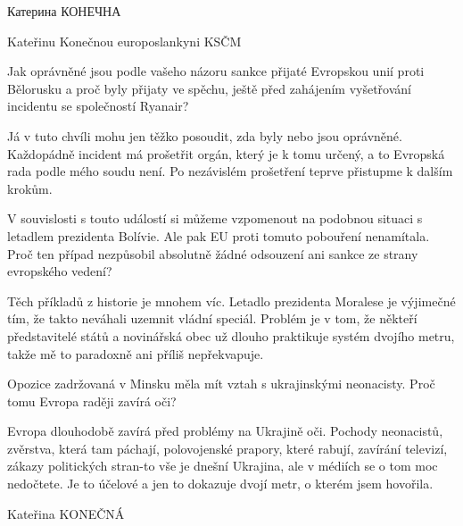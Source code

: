Катерина КОНЕЧНА

Kateřinu Konečnou europoslankyni KSČM

Jak oprávněné jsou podle vašeho názoru sankce přijaté Evropskou unií proti
Bělorusku a proč byly přijaty ve spěchu, ještě před zahájením vyšetřování
incidentu se společností Ryanair?

Já v tuto chvíli mohu jen těžko posoudit, zda byly nebo jsou oprávněné.
Každopádně incident má prošetřit orgán, který je k tomu určený, a to Evropská
rada podle mého soudu není. Po nezávislém prošetření teprve přistupme k dalším
krokům.

V souvislosti s touto událostí si můžeme vzpomenout na podobnou situaci s
letadlem prezidenta Bolívie. Ale pak EU proti tomuto pobouření nenamítala.
Proč ten případ nezpůsobil absolutně žádné odsouzení ani sankce ze strany
evropského vedení?

Těch příkladů z historie je mnohem víc. Letadlo prezidenta Moralese je
výjimečné tím, že takto neváhali uzemnit vládní speciál. Problém je v tom, že
někteří představitelé států a novinářská obec už dlouho praktikuje systém
dvojího metru, takže mě to paradoxně ani příliš nepřekvapuje.

Opozice zadržovaná v Minsku měla mít vztah s ukrajinskými neonacisty. Proč tomu
Evropa raději zavírá oči?

Evropa dlouhodobě zavírá před problémy na Ukrajině oči. Pochody neonacistů,
zvěrstva, která tam páchají, polovojenské prapory, které rabují, zavírání
televizí, zákazy politických stran-to vše je dnešní Ukrajina, ale v médiích se
o tom moc nedočtete. Je to účelové a jen to dokazuje dvojí metr, o kterém jsem
hovořila.

Kateřina KONEČNÁ
